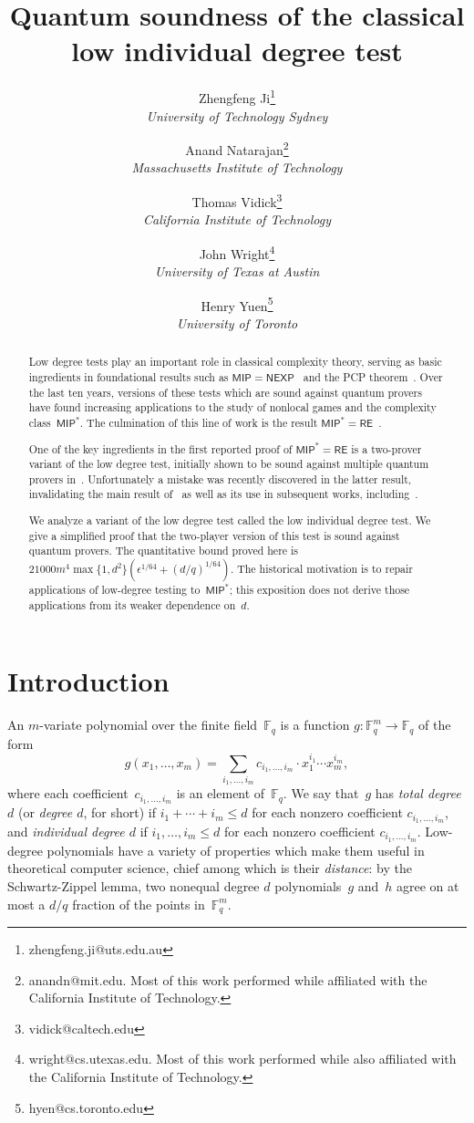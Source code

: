 \documentclass[11pt]{article}
\title{Quantum soundness of the classical low individual degree test}
\author{
Zhengfeng Ji\thanks{zhengfeng.ji@uts.edu.au}\\
\small{\sl University of Technology Sydney}
\and Anand Natarajan\thanks{anandn@mit.edu.  Most of this work performed while affiliated with
the California Institute of Technology.}\\
 \small{\sl Massachusetts Institute of Technology}
 \and Thomas Vidick\thanks{vidick@caltech.edu}\\
 \small{\sl California Institute of Technology}
 \and John Wright\thanks{wright@cs.utexas.edu. Most of this work performed while also affiliated with
the California Institute of Technology.}\\
 \small{\sl University of Texas at Austin}
 \and Henry Yuen\thanks{hyen@cs.toronto.edu}\\
 \small{\sl University of Toronto}\vspace*{10pt}
}
\date{}
\theoremstyle{definition}
\newcommand{\F}{\mathbb F}
\newcommand{\NEXP}{\mathsf{NEXP}}
\newcommand{\MIP}{\mathsf{MIP}}
\newcommand{\eps}{\epsilon}
\begin{document}
\maketitle

\begin{abstract}
Low degree tests play an important role in classical complexity theory,
serving as basic ingredients in foundational results such as $\MIP = \NEXP$~\cite{BFL91}
and the PCP theorem~\cite{AS98,ALM+98}.
Over the last ten years,
versions of these tests which are sound against quantum provers
have found increasing applications to the study of nonlocal games and the complexity class~$\MIP^*$.
The culmination of this line of work is the result $\MIP^* = \mathsf{RE}$~\cite{JNV+20}.

One of the key ingredients in the first reported proof of  $\MIP^* = \mathsf{RE}$ is a two-prover variant of the low degree test, initially
shown to be sound against multiple quantum provers in~\cite{Vid16}.
Unfortunately a mistake was recently discovered in the latter result, invalidating the main result of~\cite{Vid16} as well as its use in subsequent works, including~\cite{JNV+20}.

We analyze a variant of the low degree test called the low individual degree test.
We give a simplified proof that the two-player version of this test is
sound against quantum provers.  The quantitative bound proved here is
$21000m^4\max\{1,d^2\}(\eps^{1/64}+(d/q)^{1/64})$.
The historical motivation is to repair applications of low-degree
testing to~$\MIP^*$; this exposition does not derive those applications
from its weaker dependence on~$d$.
\end{abstract}

\newpage

\tableofcontents
\vfill
\thispagestyle{empty}
\newpage

\section{Introduction}\label{sec:intro}

An $m$-variate polynomial over the finite field~$\F_q$ is a function $g:\F_q^m \rightarrow \F_q$ of the form
\begin{equation*}
g(x_1, \ldots, x_m) = \sum_{i_1, \ldots, i_m} c_{i_1, \ldots, i_m} \cdot x_1^{i_1} \cdots x_{m}^{i_m},
\end{equation*}
where each coefficient~$c_{i_1, \ldots, i_m}$ is an element of~$\F_q$.
We say that~$g$ has \emph{total degree $d$}
(or \emph{degree $d$}, for short) if $i_1 + \cdots + i_m \leq d$ for each nonzero coefficient $c_{i_1, \ldots, i_m}$,
and \emph{individual degree $d$} if $i_1, \ldots, i_m \leq d$ for each nonzero coefficient $c_{i_1, \ldots, i_m}$.
Low-degree polynomials have a variety of properties which make them useful in theoretical computer science,
chief among which is their \emph{distance}:
by the Schwartz-Zippel lemma, two nonequal degree $d$ polynomials~$g$ and~$h$ agree on at most a $d/q$ fraction of the points in~$\F_q^m$.
\end{document}

